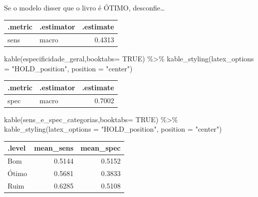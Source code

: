 \documentclass[
  9 pt,
  ignorenonframetext,
]{beamer}
\newenvironment{Shaded}{\begin{snugshade}}{\end{snugshade}}
\newcommand{\AttributeTok}[1]{\textcolor[rgb]{0.77,0.63,0.00}{#1}}
\newcommand{\ConstantTok}[1]{\textcolor[rgb]{0.00,0.00,0.00}{#1}}
\newcommand{\FunctionTok}[1]{\textcolor[rgb]{0.00,0.00,0.00}{#1}}
\newcommand{\NormalTok}[1]{#1}
\newcommand{\SpecialCharTok}[1]{\textcolor[rgb]{0.00,0.00,0.00}{#1}}
\newcommand{\StringTok}[1]{\textcolor[rgb]{0.31,0.60,0.02}{#1}}
\begin{document}
\begin{frame}[fragile]{Se o modelo disser que o livro é ÓTIMO,
desconfie\ldots{}}
\begin{table}[H]
\centering
\begin{tabular}{llr}
\toprule
.metric & .estimator & .estimate\\
\midrule
sens & macro & 0.4313\\
\bottomrule
\end{tabular}
\end{table}

\begin{Shaded}
\begin{Highlighting}[]
\FunctionTok{kable}\NormalTok{(especificidade\_geral,}\AttributeTok{booktabs=} \ConstantTok{TRUE}\NormalTok{) }\SpecialCharTok{\%\textgreater{}\%} 
  \FunctionTok{kable\_styling}\NormalTok{(}\AttributeTok{latex\_options =} \StringTok{"HOLD\_position"}\NormalTok{, }\AttributeTok{position =} \StringTok{"center"}\NormalTok{)}
\end{Highlighting}
\end{Shaded}

\begin{table}[H]
\centering
\begin{tabular}{llr}
\toprule
.metric & .estimator & .estimate\\
\midrule
spec & macro & 0.7002\\
\bottomrule
\end{tabular}
\end{table}

\begin{Shaded}
\begin{Highlighting}[]
\FunctionTok{kable}\NormalTok{(sens\_e\_spec\_categorias,}\AttributeTok{booktabs=} \ConstantTok{TRUE}\NormalTok{) }\SpecialCharTok{\%\textgreater{}\%} 
  \FunctionTok{kable\_styling}\NormalTok{(}\AttributeTok{latex\_options =} \StringTok{"HOLD\_position"}\NormalTok{, }\AttributeTok{position =} \StringTok{"center"}\NormalTok{)}
\end{Highlighting}
\end{Shaded}

\begin{table}[H]
\centering
\begin{tabular}{lrr}
\toprule
.level & mean\_sens & mean\_spec\\
\midrule
Bom & 0.5144 & 0.5152\\
Ótimo & 0.5681 & 0.3833\\
Ruim & 0.6285 & 0.5108\\
\bottomrule
\end{tabular}
\end{table}
\end{frame}
\end{document}

